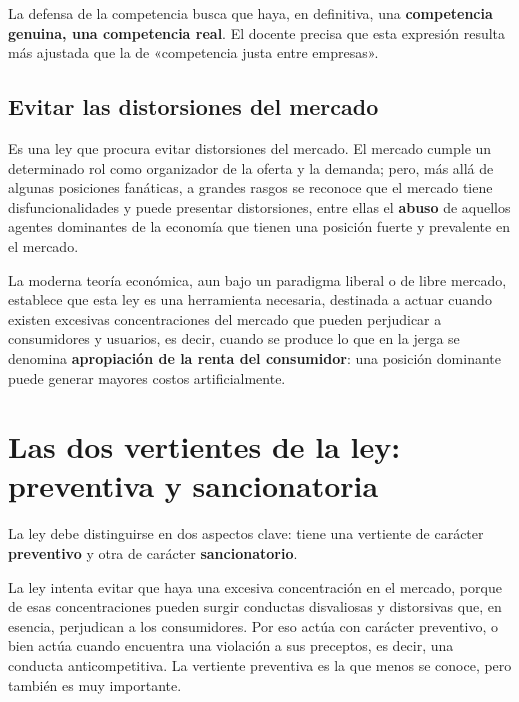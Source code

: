 \documentclass[12pt,oneside]{book}
\begin{document}
La defensa de la competencia busca que haya, en definitiva, una \textbf{competencia genuina, una competencia real}. El docente precisa que esta expresión resulta más ajustada que la de «competencia justa entre empresas».

\subsection{Evitar las distorsiones del mercado}

Es una ley que procura evitar distorsiones del mercado. El mercado cumple un determinado rol como organizador de la oferta y la demanda; pero, más allá de algunas posiciones fanáticas, a grandes rasgos se reconoce que el mercado tiene disfuncionalidades y puede presentar distorsiones, entre ellas el \textbf{abuso} de aquellos agentes dominantes de la economía que tienen una posición fuerte y prevalente en el mercado.

La moderna teoría económica, aun bajo un paradigma liberal o de libre mercado, establece que esta ley es una herramienta necesaria, destinada a actuar cuando existen excesivas concentraciones del mercado que pueden perjudicar a consumidores y usuarios, es decir, cuando se produce lo que en la jerga se denomina \textbf{apropiación de la renta del consumidor}: una posición dominante puede generar mayores costos artificialmente.

\section{Las dos vertientes de la ley: preventiva y sancionatoria}

La ley debe distinguirse en dos aspectos clave: tiene una vertiente de carácter \textbf{preventivo} y otra de carácter \textbf{sancionatorio}.

La ley intenta evitar que haya una excesiva concentración en el mercado, porque de esas concentraciones pueden surgir conductas disvaliosas y distorsivas que, en esencia, perjudican a los consumidores. Por eso actúa con carácter preventivo, o bien actúa cuando encuentra una violación a sus preceptos, es decir, una conducta anticompetitiva. La vertiente preventiva es la que menos se conoce, pero también es muy importante.
\end{document}
